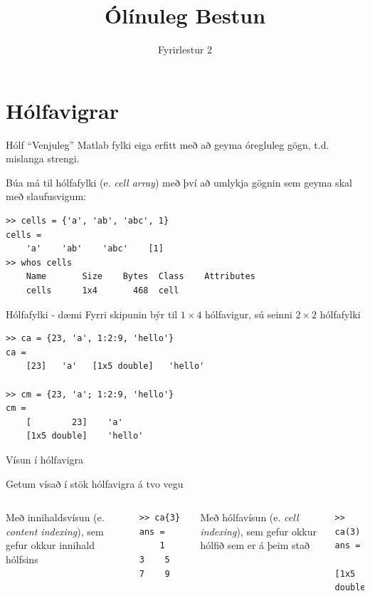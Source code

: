 \documentclass{beamer}
\title{Ólínuleg Bestun}
\subtitle{Fyrirlestur 2}
\begin{document}
\begin{frame}
\titlepage
\end{frame}

\section{Hólfavigrar}

\begin{frame}[fragile]{Hólf}
    ``Venjuleg'' Matlab fylki eiga erfitt með að geyma óregluleg gögn, t.d. mislanga strengi.

    Búa má til hólfafylki (e. \emph{cell array}) með því að umlykja gögnin sem geyma skal með slaufusvigum:
    
\begin{verbatim}
>> cells = {'a', 'ab', 'abc', 1}
cells = 
    'a'    'ab'    'abc'    [1]
>> whos cells
    Name       Size    Bytes  Class    Attributes
    cells      1x4       468  cell
\end{verbatim}
\end{frame}

\begin{frame}[fragile]{Hólfafylki - dæmi}
    Fyrri skipunin býr til $1\times 4$ hólfavigur, sú seinni $2 \times 2$ hólfafylki
\begin{verbatim}
>> ca = {23, 'a', 1:2:9, 'hello'} 
ca = 
    [23]   'a'   [1x5 double]   'hello'

>> cm = {23, 'a'; 1:2:9, 'hello'}
cm = 
    [        23]    'a'    
    [1x5 double]    'hello'
\end{verbatim}
\end{frame}

\begin{frame}[fragile]{Vísun í hólfavigra}
    \begin{center}
    Getum vísað í stök hólfavigra á tvo vegu
    \end{center}
    
    \begin{columns}
    Með innihaldsvísun (e. \emph{content indexing}), sem gefur okkur innihald hólfsins
\begin{verbatim}
>> ca{3}
ans =
    1    3    5    7    9
\end{verbatim}
    Með hólfavísun (e. \emph{cell indexing}), sem gefur okkur hólfið sem er á þeim stað
\begin{verbatim}
>> ca(3)
ans = 
    [1x5 double]
\end{verbatim}
    \end{columns}
\end{frame}
\end{document}
